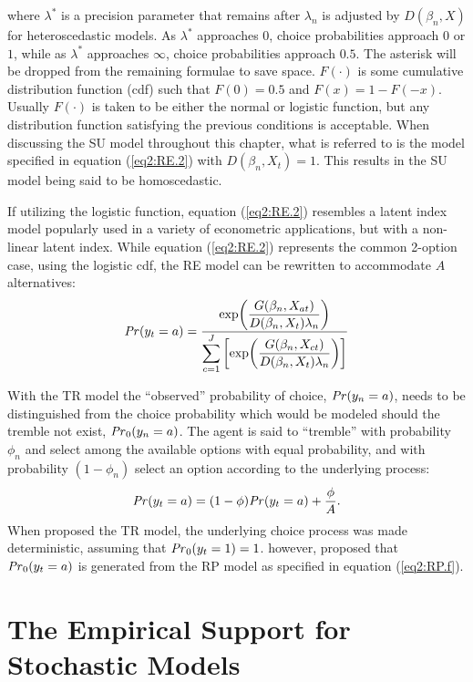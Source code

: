 \documentclass[../main.tex]{subfiles}
\begin{document}
\noindent where $\lambda^*$ is a precision parameter that remains after $\lambda_n$ is adjusted by $D(\beta_n,X)$ for heteroscedastic models.
As $\lambda^*$ approaches $0$, choice probabilities approach $0$ or $1$, while as $\lambda^*$ approaches $\infty$, choice probabilities approach $0.5$.
The asterisk will be dropped from the remaining formulae to save space.
$F(\cdot)$ is some cumulative distribution function (cdf) such that $F(0) = 0.5$ and $F(x) = 1 - F(-x)$.
Usually $F(\cdot)$ is taken to be either the normal or logistic function, but any distribution function satisfying the previous conditions is acceptable.
When discussing the SU model throughout this chapter, what is referred to is the model specified in equation (\ref{eq2:RE.2}) with $D(\beta_n,X_t) = 1$.
This results in the SU model being said to be homoscedastic.

If utilizing the logistic function, equation (\ref{eq2:RE.2}) resembles a latent index model popularly used in a variety of econometric applications, but with a non-linear latent index.
While equation (\ref{eq2:RE.2}) represents the common 2-option case, using the logistic cdf, the RE model can be rewritten to accommodate $A$ alternatives:
\begin{equation}
	\label{eq2:RE.f}
	{\ensuremath{\mathit{Pr}}}(y_t=a) =\dfrac{\exp\!\left( \dfrac{ G(\beta_n,X_{at}) }{ D(\beta_n,X_{t})\lambda_n }  \right)}{ \displaystyle\sum_{c=1}^J \left[ \exp\!\left( \dfrac{ G(\beta_n,X_{ct}) }{ D(\beta_n,X_{t})\lambda_n }  \right)  \right]  }
\end{equation}

With the TR model the \enquote{observed} probability of choice, ${\mathit{Pr}}(y_n=a)$, needs to be distinguished from the choice probability which would be modeled should the tremble not exist, ${\mathit{Pr}}_0(y_n=a)$.
The agent is said to \enquote{tremble} with probability $\phi_n$ and select among the available options with equal probability, and with probability $(1-\phi_n)$ select an option according to the underlying process:
\begin{equation}
	\label{eq2:TR.f}
	{\ensuremath{\mathit{Pr}}}(y_t=a) = (1-\phi) {\mathit{Pr}}(y_t=a) + \frac{\phi}{A}.
\end{equation}
When \textcite{Harless1994} proposed the TR model, the underlying choice process was made deterministic, assuming that ${\mathit{Pr}}_0(y_t=1) = 1$.
\textcite{Loomes2002} however, proposed that ${\mathit{Pr}}_0(y_t=a)$ is generated from the RP model as specified in equation (\ref{eq2:RP.f}).

\singlespacing
\section{The Empirical Support for Stochastic Models}
\doublespacing
\end{document}
